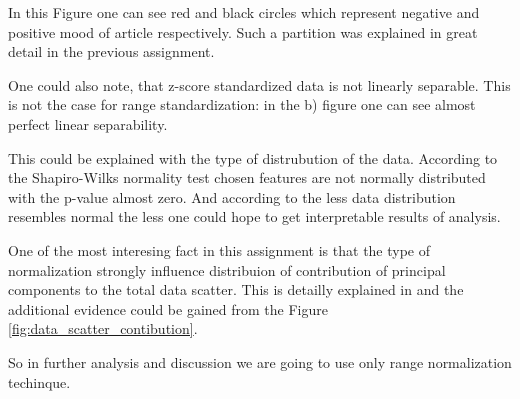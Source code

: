 In this Figure one can see red and black circles which represent negative and positive mood of article respectively. Such a partition was explained in great detail in the previous assignment. 

One could also note, that z-score standardized data is not linearly separable. This is not the case for range standardization: in the b) figure one can see almost perfect linear separability. 

This could be explained with the type of distrubution of the data. According to the Shapiro-Wilks normality test chosen features are not normally distributed with the p-value almost zero. And according to \cite{CCODA_Mirkin} the less data distribution resembles normal the less one could hope to get interpretable results of analysis. 

One of the most interesing fact in this assignment is that the type of normalization strongly influence distribuion of contribution of principal components to the total data scatter. This is detailly explained in \cite{CCODA_Mirkin} and the additional evidence could be gained from the Figure \ref{fig:data_scatter_contibution}. 

So in further analysis and discussion we are going to use only range normalization techinque.



